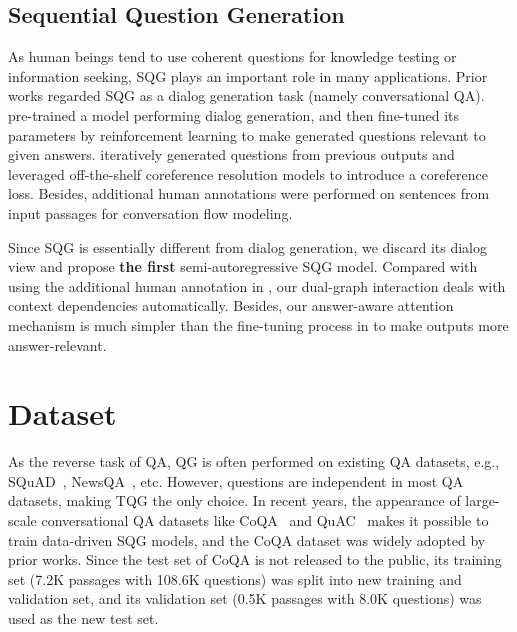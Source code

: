 \documentclass[11pt,a4paper]{article}
\begin{document}
\subsection{Sequential Question Generation}
As human beings tend to use coherent questions for knowledge testing or information seeking, SQG plays an important role in many applications. 
Prior works regarded SQG as a dialog generation task (namely conversational QA). 
\citet{pan2019reinforced} pre-trained a model performing dialog generation, and then fine-tuned its parameters by reinforcement learning to make generated questions relevant to given answers.
\citet{gao2019interconnected} iteratively generated questions from previous outputs and leveraged off-the-shelf coreference resolution models to introduce a coreference loss. Besides, additional human annotations were performed on sentences from input passages for conversation flow modeling.

Since SQG is essentially different from dialog generation, we discard its dialog view and propose \textbf{the first} semi-autoregressive SQG model. Compared with using the additional human annotation in \citet{gao2019interconnected}, our dual-graph interaction deals with context dependencies automatically. Besides, our answer-aware attention mechanism is much simpler than the fine-tuning process in \citet{pan2019reinforced} to make outputs more answer-relevant.

\section{Dataset}
As the reverse task of QA, QG is often performed on existing QA datasets, e.g., SQuAD~\cite{rajpurkar2016squad}, NewsQA~\cite{trischler2016newsqa}, etc. 
However, questions are independent in most QA datasets, making TQG the only choice. 
In recent years, the appearance of large-scale conversational QA datasets like CoQA~\cite{reddy2019coqa} and QuAC~\cite{choi2018quac} makes it possible to train data-driven SQG models, and the CoQA dataset was widely adopted by prior works. Since the test set of CoQA is not released to the public, its training set (7.2K passages with 108.6K questions) was split into new training and validation set, and its validation set (0.5K passages with 8.0K questions) was used as the new test set.
\end{document}
